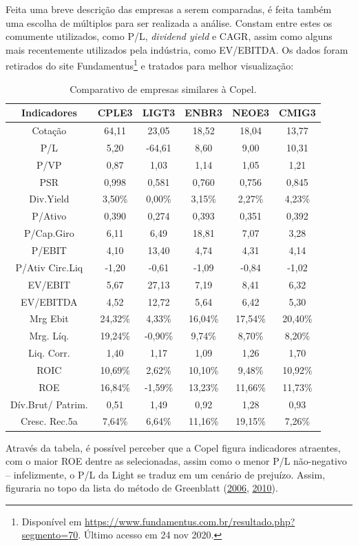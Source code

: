 \documentclass[grad,numbers]{coppe}
\begin{document}
  Feita uma breve descrição das empresas a serem comparadas, é feita também uma escolha de múltiplos para ser realizada a análise. Constam entre estes os comumente utilizados, como P/L, \emph{dividend yield} e CAGR, assim como alguns mais recentemente utilizados pela indústria, como EV/EBITDA. Os dados foram retirados do site Fundamentus\footnote{Disponível em \url{https://www.fundamentus.com.br/resultado.php?segmento=70}. Último acesso em 24 nov 2020.} e tratados para melhor visualização:
  \begin{table}[H]

  \caption{\label{tab:unnamed-chunk-18}Comparativo de empresas similares à Copel.}
  \centering
  \begin{tabular}[t]{cccccc}
  \toprule
  Indicadores & CPLE3 & LIGT3 & ENBR3 & NEOE3 & CMIG3\\
  \midrule
  Cotação & 64,11 & 23,05 & 18,52 & 18,04 & 13,77\\
  P/L & 5,20 & -64,61 & 8,60 & 9,00 & 10,31\\
  P/VP & 0,87 & 1,03 & 1,14 & 1,05 & 1,21\\
  PSR & 0,998 & 0,581 & 0,760 & 0,756 & 0,845\\
  Div.Yield & 3,50\% & 0,00\% & 3,15\% & 2,27\% & 4,23\%\\
  \addlinespace
  P/Ativo & 0,390 & 0,274 & 0,393 & 0,351 & 0,392\\
  P/Cap.Giro & 6,11 & 6,49 & 18,81 & 7,07 & 3,28\\
  P/EBIT & 4,10 & 13,40 & 4,74 & 4,31 & 4,14\\
  P/Ativ Circ.Liq & -1,20 & -0,61 & -1,09 & -0,84 & -1,02\\
  EV/EBIT & 5,67 & 27,13 & 7,19 & 8,41 & 6,32\\
  \addlinespace
  EV/EBITDA & 4,52 & 12,72 & 5,64 & 6,42 & 5,30\\
  Mrg Ebit & 24,32\% & 4,33\% & 16,04\% & 17,54\% & 20,40\%\\
  Mrg. Líq. & 19,24\% & -0,90\% & 9,74\% & 8,70\% & 8,20\%\\
  Liq. Corr. & 1,40 & 1,17 & 1,09 & 1,26 & 1,70\\
  ROIC & 10,69\% & 2,62\% & 10,10\% & 9,48\% & 10,92\%\\
  \addlinespace
  ROE & 16,84\% & -1,59\% & 13,23\% & 11,66\% & 11,73\%\\
  Dív.Brut/ Patrim. & 0,51 & 1,49 & 0,92 & 1,28 & 0,93\\
  Cresc. Rec.5a & 7,64\% & 6,64\% & 11,16\% & 19,15\% & 7,26\%\\
  \bottomrule
  \end{tabular}
  \end{table}
  Através da tabela, é possível perceber que a Copel figura indicadores atraentes, com o maior ROE dentre as selecionadas, assim como o menor P/L não-negativo -- infelizmente, o P/L da Light se traduz em um cenário de prejuízo. Assim, figuraria no topo da lista do método de Greenblatt (\protect\hyperlink{ref-greenblatt2006}{2006}, \protect\hyperlink{ref-greenblatt2010}{2010}).
\end{document}
